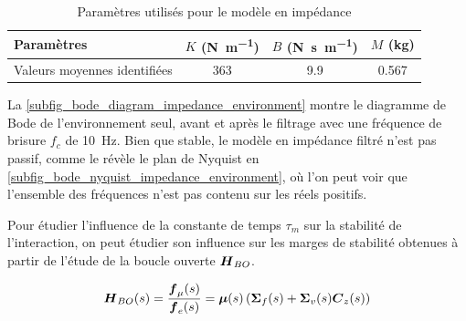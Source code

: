 \begin{table}
	\centering
	\begin{tabular}{l | c | c | c }
		Paramètres & $K$ (\si{\newton\per\meter}) & $B$ (\si{\newton\second\per\meter}) & $M$ (\si{\kilogram})\\\hline%
		Valeurs moyennes identifiées & 363 & 9.9 & 0.567\\%
	\end{tabular}
	\caption{Paramètres utilisés pour le modèle en impédance}
	\label{tab_impedance_param_user_851}
\end{table}

La \cref{subfig_bode_diagram_impedance_environment} montre le diagramme de Bode de l'environnement seul, avant et après le filtrage avec une fréquence de brisure $f_c$ de \SI{10}{\hertz}. Bien que stable, le modèle en impédance filtré n'est pas passif, comme le révèle le plan de Nyquist en \cref{subfig_bode_nyquist_impedance_environment}, où l'on peut voir que l'ensemble des fréquences n'est pas contenu sur les réels positifs.



Pour étudier l'influence de la constante de temps $\tau_m$ sur la stabilité de l'interaction, on peut étudier son influence sur les marges de stabilité obtenues à partir de l'étude de la boucle ouverte $\matr{H}_{BO}$.

\begin{equation} \label{eq_open_loop_system}
	\matr{H}_{BO}(s) = \frac{\vect{f}_\mu(s)}{\vect{f}_{e}(s)} = \matr{\mu}(s)\left( \matr{\Sigma}_f(s) + \matr{\Sigma}_v(s) \matr{C}_z(s) \right)
\end{equation}

